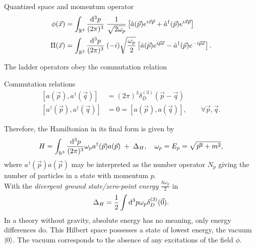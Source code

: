 \begin{mybox}{Quantized space and momentum operator}
	\begin{align}
		\phi(\vec{x})&= \int_{\mathbb{R}^3} \frac{\mathrm{d}^3 p}{(2 \pi)^3} \; \frac{1}{\sqrt{2 \omega_p}} \left[\hat{a}(\vec{p}) e^{i \vec{x}\vec{p}} +\hat{a}^{\dagger}(\vec{p})e^{ i \vec{x}\vec{p}}  \right]\\
		\Pi(\vec{x}) &= \int_{\mathbb{R}^3} \frac{\mathrm{d}^3 p}{(2 \pi)^3} \; (-i) \sqrt{\frac{\omega_p}{2}} \left[\hat{a}(\vec{p}) e^{i \vec{p}\vec{x}} - \hat{a}^{\dagger}(\vec{p}) e^{-i\vec{p}\vec{x}} \right].
	\end{align}
\end{mybox}
The ladder operators obey the commutation relation
\begin{mybox}{Commutation relations}
	\begin{align}
		\left[a(\vec{p}), a^{\dagger} (\vec{q})  \right] &= (2 \pi)^3 \delta^{(3)}_D(\vec{p}-\vec{q}) \\
		\left[a^{\dagger}(\vec{p}), a^{\dagger} (\vec{q}) \right] &=0= \left[a(\vec{p}), a(\vec{q})\right], \qquad \forall \vec{p},\vec{q}.
	\end{align}
\end{mybox}
Therefore, the Hamiltonian in its final form is given by
\begin{equation}
	H = \int_{\mathbb{R}^3} \frac{\mathrm{d}^3 p}{(2 \pi)^3} \omega_p a^{\dagger}(\vec{p}) a(\vec{p}) \; + \; \Delta_H, \quad \omega_p = E_p =\sqrt{\vec{p}^2+m^2},
\end{equation}
where $a^{\dagger}(\vec{p}) a(\vec{p}) $ may be interpreted as the number operator $N_p$ giving the number of particles in a state with momentum $p$.\\
With the \emph{divergent ground state/zero-point energy} $\frac{\hbar \omega_p}{2}$ in
\begin{equation}
\label{eq:divergentGroundstateEnergy}
	\Delta_H = \frac{1}{2} \int \mathrm{d}^3 p \omega_p \delta^{(3)}_D(\vec{0}).
\end{equation}
In a theory without gravity, absolute energy has no meaning, only energy differences do. This Hilbert space possesses a state of lowest energy, the vacuum $\ket{0}$. The vacuum corresponds to the absence of any excitations of the field $\phi$.\\
\\
